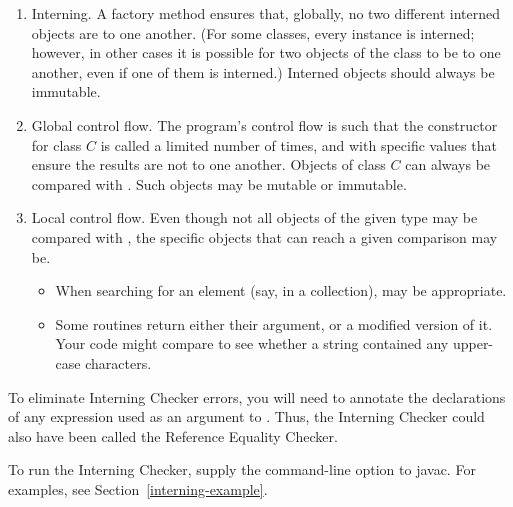 \begin{enumerate}
\item
  Interning.  A factory method ensures that, globally, no two different
  interned objects are  to one another.
  (For some classes, every instance is interned; however, in other cases it is
  possible for two objects of the class to be
   to one another, even if one of them is interned.)
  Interned objects should always be immutable.
\item
  Global control flow.  The program's control flow is such that the
  constructor for class $C$ is called a limited number of times, and with
  specific values that ensure the results are not  to one
  another.  Objects of class $C$ can always be compared with \code{==}.
  Such objects may be mutable or immutable.
\item
  Local control flow.  Even though not all objects of the given type may be
  compared with \code{==}, the specific objects that can reach a given
  comparison may be.
  \begin{itemize}
  \item
    When searching for an element (say, in a collection), \code{==} may be
    appropriate.
  \item
    Some routines return either their argument, or a modified version of
    it.  Your code might compare  to see whether
    a string contained any upper-case characters.
  \end{itemize}
\end{enumerate}

To eliminate Interning Checker errors, you will need to annotate the
declarations of any expression used as an argument to \code{==}.
Thus, the Interning Checker
could also have been called the Reference Equality Checker.

\begin{sloppypar}
To run the Interning Checker, supply the
command-line option to javac.  For examples, see Section~\ref{interning-example}.
\end{sloppypar}



